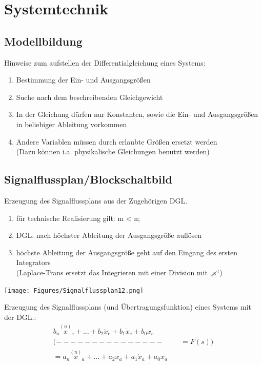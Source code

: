 \section{Systemtechnik}
\subsection{Modellbildung}
Hinweise zum aufstellen der Differentialgleichung eines Systems:
\begin{mdframed}[style=exercise]
	\begin{enumerate}
		\item Bestimmung der Ein- und Ausgangsgrößen
		\item Suche nach dem beschreibenden Gleichgewicht
		\item In der Gleichung dürfen nur Konstanten, sowie die Ein- und
		      Ausgangsgrößen in beliebiger Ableitung vorkommen
		\item Andere Variablen müssen durch erlaubte Größen ersetzt werden\\
		      \footnotesize
		      (Dazu können i.a. physikalische Gleichungen benutzt werden)
	\end{enumerate}
\end{mdframed}

\subsection{Signalflussplan/Blockschaltbild}
Erzeugung des Signalflussplans aus der Zugehörigen DGL.
\begin{mdframed}[style=exercise]
	\begin{enumerate}
		\item für technische Realisierung gilt: m < n;

		\item DGL. nach höchster Ableitung der Ausgangsgröße auflösen

		\item höchste Ableitung der Ausgangsgröße geht auf den Eingang des ersten Integrators\\
		      \footnotesize
		      (Laplace-Trans ersetzt das Integrieren mit einer Division mit „s“)
	\end{enumerate}
\end{mdframed}
\begin{center}
	\texttt{[image: Figures/Signalflussplan12.png]}
\end{center}

Erzeugung des Signalflussplans (und Übertragungsfunktion) eines Systems mit der DGL.:
\begin{align*}
	  b_{n} \overset{(n)}{x}_{e}+\ldots+b_{2} \ddot{x}_{e}+b_{1} \dot{x}_{e}+b_{0} x_{e} & \\
	  (---------------& \quad = F(s) )\\
	= a_{n} \overset{(n)}{x}_{a}+\ldots+a_{2} \ddot{x}_{a}+a_{1} \dot{x}_{a}+a_{0} x_{a} &
\end{align*}

